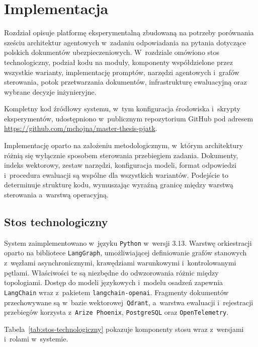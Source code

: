 \chapter{Implementacja}\label{chap:implementacja}

Rozdział opisuje platformę eksperymentalną zbudowaną na potrzeby porównania
sześciu architektur agentowych w~zadaniu odpowiadania na pytania dotyczące
polskich dokumentów ubezpieczeniowych. W~rozdziale omówiono stos
technologiczny, podział kodu na moduły, komponenty współdzielone przez
wszystkie warianty, implementację promptów, narzędzi agentowych i~grafów
sterowania, potok przetwarzania dokumentów, infrastrukturę ewaluacyjną oraz
wybrane decyzje inżynieryjne.

Kompletny kod źródłowy systemu, w~tym konfiguracja środowiska i~skrypty
eksperymentów, udostępniono w~publicznym repozytorium GitHub pod adresem
\url{https://github.com/mchojna/master-thesis-pjatk}.

Implementację oparto na założeniu metodologicznym, w~którym architektury różnią
się wyłącznie sposobem sterowania przebiegiem zadania. Dokumenty, indeks
wektorowy, zestaw narzędzi, konfiguracja modeli, format odpowiedzi i~procedura
ewaluacji są wspólne dla wszystkich wariantów. Podejście to determinuje
strukturę kodu, wymuszając wyraźną granicę między warstwą sterowania a~warstwą
operacyjną.

\section{Stos technologiczny}\label{sec:stos-technologiczny}

System zaimplementowano w~języku \texttt{Python} w~wersji 3.13. Warstwę
orkiestracji oparto na bibliotece \texttt{LangGraph}, umożliwiającej
definiowanie grafów stanowych z~węzłami asynchronicznymi, krawędziami
warunkowymi i~kontrolowanymi pętlami. Właściwości te są niezbędne do
odwzorowania różnic między topologiami. Dostęp do modeli językowych i~modelu
osadzeń zapewnia \texttt{LangChain} wraz z~pakietem \texttt{langchain-openai}.
Fragmenty dokumentów przechowywane są w~bazie wektorowej~\texttt{Qdrant},
a~warstwa ewaluacji i~rejestracji przebiegów korzysta z~\texttt{Arize Phoenix},
\texttt{PostgreSQL} oraz \texttt{OpenTelemetry}.

Tabela~\ref{tab:stos-technologiczny} pokazuje komponenty stosu wraz z~wersjami
i~rolami w~systemie.

